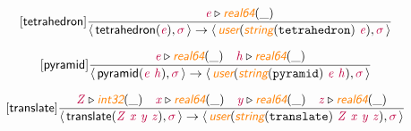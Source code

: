 \documentclass[10pt,leqno,fleqn]{article}
\newcommand{\artVariable}[1]{\mbox{\color{purple}\em #1\/}}
\newcommand{\artConstructor}[1]{\mbox{\sf #1}}
\newcommand{\artCaseInsensitiveLiteral}[1]{\mbox{\tt #1}}
\newcommand{\artSpecial}[1]{\mbox{\color{orange}\sf\em #1}}
\begin{document}
\begin{equation}
\tag*{[\artConstructor{\sf tetrahedron}]}
\begin{split}\frac{ \artVariable{e}\triangleright \artSpecial{real64}(\_) }{\langle\, \artConstructor{\sf tetrahedron}(\artVariable{e}), \artVariable{$\sigma$}\,\rangle \rightarrow \langle\, \artSpecial{user}(\artSpecial{string}(\artCaseInsensitiveLiteral{tetrahedron})\ \artVariable{e}), \artVariable{$\sigma$}\,\rangle }
\end{split}
\end{equation}

\begin{equation}
\tag*{[\artConstructor{\sf pyramid}]}
\begin{split}\frac{ \artVariable{e}\triangleright \artSpecial{real64}(\_) \quad  \artVariable{h}\triangleright \artSpecial{real64}(\_) }{\langle\, \artConstructor{\sf pyramid}(\artVariable{e}\ \artVariable{h}), \artVariable{$\sigma$}\,\rangle \rightarrow \langle\, \artSpecial{user}(\artSpecial{string}(\artCaseInsensitiveLiteral{pyramid})\ \artVariable{e}\ \artVariable{h}), \artVariable{$\sigma$}\,\rangle }
\end{split}
\end{equation}

\begin{equation}
\tag*{[\artConstructor{\sf translate}]}
\begin{split}\frac{ \artVariable{Z}\triangleright \artSpecial{int32}(\_) \quad  \artVariable{x}\triangleright \artSpecial{real64}(\_) \quad  \artVariable{y}\triangleright \artSpecial{real64}(\_) \quad  \artVariable{z}\triangleright \artSpecial{real64}(\_) }{\langle\, \artConstructor{\sf translate}(\artVariable{Z}\ \artVariable{x}\ \artVariable{y}\ \artVariable{z}), \artVariable{$\sigma$}\,\rangle \rightarrow \langle\, \artSpecial{user}(\artSpecial{string}(\artCaseInsensitiveLiteral{translate})\ \artVariable{Z}\ \artVariable{x}\ \artVariable{y}\ \artVariable{z}), \artVariable{$\sigma$}\,\rangle }
\end{split}
\end{equation}
\end{document}
